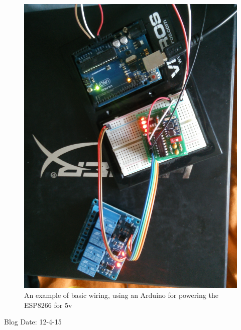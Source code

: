 \begin{figure}[h!]
   \includegraphics[scale=0.05]{circuit1}
   \caption{An example of basic wiring, using an Arduino for powering the ESP8266 for 5v}
\end{figure}
Blog Date: 12-4-15

